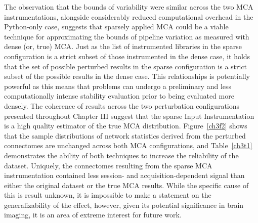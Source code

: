 The observation that the bounds of variability were similar across the two MCA instrumentations, alongside
considerably reduced computational overhead in the Python-only case, suggests that sparsely applied MCA could be a
viable technique for approximating the bounds of pipeline variation as measured with dense (or, true) MCA. Just as
the list of instrumented libraries in the sparse configuration is a strict subset of those instrumented in the
dense case, it holds that the set of possible perturbed results in the sparse configuration is a strict subset of
the possible results in the dense case. This relationships is potentially powerful as this means that problems can
undergo a preliminary and less computationally intense stability evaluation prior to being evaluated more densely.
The coherence of results across the two perturbation configurations presented throughout Chapter III suggest that
the sparse Input Instrumentation is a high quality estimator of the true MCA distribution. Figure~\ref{ch3f2}
shows that the sample distributions of network statistics derived from the perturbed connectomes are unchanged
across both MCA configurations, and Table~\ref{ch3t1} demonstrates the ability of both techniques to increase the
reliability of the dataset. Uniquely, the connectomes resulting from the sparse MCA instrumentation contained less
session- and acquisition-dependent signal than either the original dataset or the true MCA results. While the
specific cause of this is result unknown, it is impossible to make a statement on the generalizability of the
effect, however, given its potential significance in brain imaging, it is an area of extreme interest for future
work.


